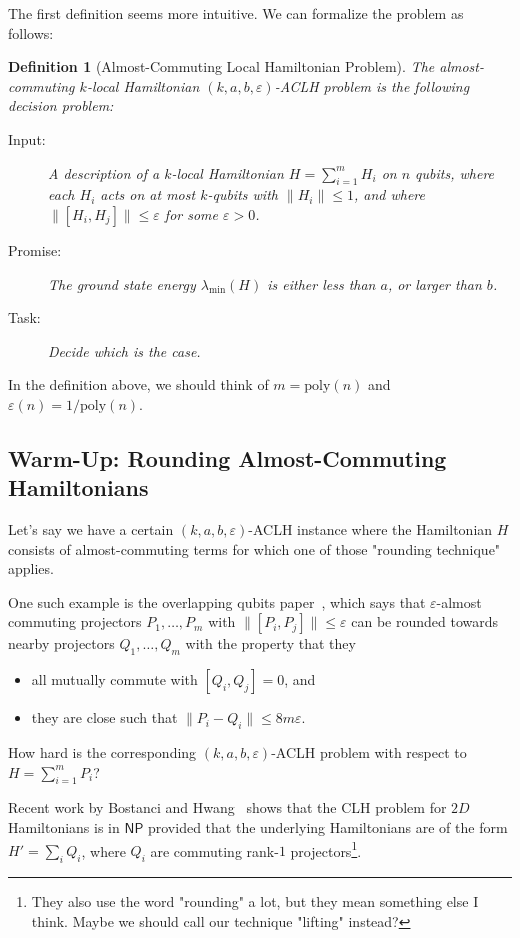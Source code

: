 \documentclass[11pt]{article}
\theoremstyle{plain}
\newtheorem{definition}[theorem]{Definition}
\newcommand{\eps}{\varepsilon}
\begin{document}
The first definition seems more intuitive. We can formalize the problem as follows:

\begin{definition}[Almost-Commuting Local Hamiltonian Problem] 
The almost-commuting $k$-local Hamiltonian $(k,a,b,\eps)$-ACLH problem is the following decision problem:
\begin{description}
    \item[Input:] A description of a $k$-local Hamiltonian $H = \sum_{i=1}^m H_i$ on $n$ qubits, where each $H_i$ acts on at most $k$-qubits with $\|H_i \| \leq 1$, and where $\|[H_i,H_j]\| \leq \eps$ for some $\eps > 0$.

    \item[Promise:] The ground state energy $\lambda_{\mathrm{min}}(H)$ is either less than $a$, or larger than $b$.

    \item[Task:] Decide which is the case.
\end{description}    
\end{definition}
In the definition above, we should think of $m=\mathrm{poly}(n)$ and $\eps(n)= 1/\mathrm{poly}(n)$.

\subsection{Warm-Up: Rounding Almost-Commuting Hamiltonians}

Let's say we have a certain $(k,a,b,\eps)$-ACLH instance where the Hamiltonian $H$ consists of almost-commuting terms for which one of those "rounding technique" applies.

One such example is the overlapping qubits paper~\cite[Theorem 3.2]{https://doi.org/10.4230/lipics.itcs.2017.48}, which says that $\eps$-almost commuting projectors $P_1,\dots,P_m$ with $\|[P_i,P_j]\| \leq \eps$ can be rounded towards nearby projectors $Q_1,\dots,Q_m$ with the property that they
\begin{itemize}
    \item all mutually commute with $[Q_i,Q_j]=0$, and
    \item they are close such that $\|P_i - Q_i\| \leq 8 m \eps$.
\end{itemize}
How hard is the corresponding $(k,a,b,\eps)$-ACLH problem with respect to $H= \sum_{i=1}^m P_i$?

Recent work by Bostanci and Hwang~\cite{bostanci2025commutinglocalhamiltonians2d} shows that the CLH problem for $2D$ Hamiltonians is in $\mathsf{NP}$ provided that the underlying Hamiltonians are of the form $H'=\sum_i Q_i$, where $Q_i$ are commuting rank-$1$ projectors\footnote{They also use the word "rounding" a lot, but they mean something else I think. Maybe we should call our technique "lifting" instead?}. 
\end{document}
